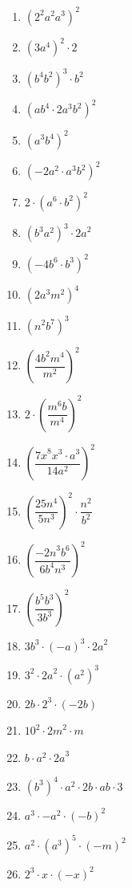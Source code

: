 \documentclass[12pt,parskip=half-, twoside=semi]{scrartcl}
\begin{document}
\begin{exercise}
\begin{enumerate}[cols=3]
  \item \(\left( 2^{2}a^{2}a^{3} \right)^{2} \)
  \item \(\left( 3a^{4} \right)^{2} \cdot 2 \)
  \item \(\left( b^{4}b^{2} \right)^{3} \cdot b^{2} \)
  \item \(\left( {ab}^{4} \cdot 2a^{3}b^{2} \right)^{2} \)
  \item \(\left( a^{3}b^{4} \right)^{2} \)
  \item \(\left( - 2a^{2} \cdot a^{3}b^{2} \right)^{2} \)
  \item \({2 \cdot \left( a^{6} \cdot b^{2} \right)}^{2} \)
  \item \(\left( b^{3}a^{2} \right)^{3} \cdot {2a}^{2} \)
  \item \(\left( - 4b^{6} \cdot b^{3} \right)^{2} \)
  \item \(\left( 2a^{3}m^{2} \right)^{4} \)
  \item \(\left( n^{2}b^{7} \right)^{3} \)
  \item \(\left( \dfrac{{4b}^{2}m^{4}}{m^{2}} \right)^{2} \)
  \item \(2 \cdot \left( \dfrac{m^{6}b}{m^{4}} \right)^{2} \)
  \item \(\left( \dfrac{{7x}^{8}x^{3} \cdot a^{3}}{14a^{2}} \right)^{2} \)
  \item \(\left( \dfrac{25n^{4}}{5n^{3}} \right)^{2} \cdot \dfrac{n^{2}}{b^{2}} \)
  \item \(\left( \dfrac{{- 2n}^{3}b^{6}}{6b^{4}n^{3}} \right)^{2} \)
  \item \(\left( \dfrac{b^{5}b^{3}}{3b^{3}} \right)^{2} \)
  \item \({3b}^{3} \cdot ( - a)^{3} \cdot {2a}^{2} \)
  \item \(3^{2} \cdot {2a}^{2} \cdot \left( a^{2} \right)^{3} \)
  \item \(2b \cdot 2^{3} \cdot ( - 2b) \)
  \item \(10^{2} \cdot {2m}^{2} \cdot m \)
  \item \(b \cdot a^{2} \cdot {2a}^{3} \)
  \item \(\left( b^{3} \right)^{4} \cdot a^{2} \cdot 2b \cdot ab \cdot 3 \)
  \item \(a^{3} \cdot {- a}^{2} \cdot ( - b)^{2} \)
  \item \(a^{2} \cdot \left( a^{3} \right)^{5} \cdot ( - m)^{2} \)
  \item \(2^{3} \cdot x \cdot ( - x)^{2} \)
    
  \end{enumerate}
  
\end{exercise}
\end{document}
